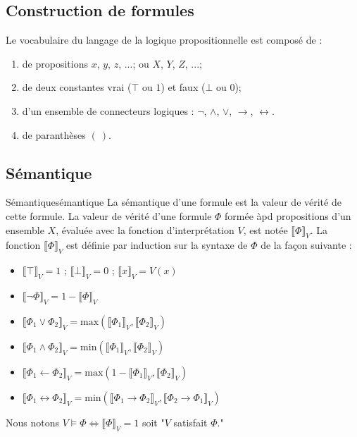 \subsection{Construction de formules}
Le vocabulaire du langage de la logique propositionnelle est composé de :
\begin{enumerate}
  \item de propositions $x$, $y$, $z$, ...; ou $X$, $Y$, $Z$, ...;
  \item de deux constantes vrai ($\top$ ou $1$) et faux ($\bot$ ou $0$);
  \item d'un ensemble de connecteurs logiques : $\neg$, $\wedge$, $\vee$, $\rightarrow$, $\leftrightarrow$.
  \item de paranthèses $(\ )$.
\end{enumerate}


\subsection{Sémantique}
\begin{definition}{Sémantique}{sémantique}
La sémantique d'une formule est la valeur de vérité de cette formule. La valeur de vérité d'une formule
$\Phi$ formée àpd propositions d'un ensemble $X$, évaluée avec la fonction d'interprétation $V$, est notée $\llbracket \Phi \rrbracket_V$.
La fonction $\llbracket \Phi \rrbracket_V$ est définie par induction sur la syntaxe de $\Phi$ de la façon suivante :
\begin{itemize}[label=$\bullet$]
  \item $\llbracket \top\rrbracket_V = 1$ ; $\llbracket \bot\rrbracket_V = 0$ ; $\llbracket x\rrbracket_V = V(x)$
  \item $\llbracket \neg \Phi\rrbracket_V = 1 - \llbracket \Phi\rrbracket_V$
  \item $\llbracket \Phi_1 \vee \Phi_2\rrbracket_V = \text{max}(\llbracket\Phi_1\rrbracket_V,\llbracket\Phi_2\rrbracket_V)$
  \item $\llbracket \Phi_1 \land \Phi_2\rrbracket_V = \text{min}(\llbracket\Phi_1\rrbracket_V,\llbracket\Phi_2\rrbracket_V)$
  \item $\llbracket \Phi_1 \leftarrow \Phi_2\rrbracket_V = \text{max}(1 - \llbracket\Phi_1\rrbracket_V,\llbracket\Phi_2\rrbracket_V)$
  \item $\llbracket \Phi_1 \leftrightarrow \Phi_2\rrbracket_V = \text{min}(\llbracket\Phi_1\rightarrow\Phi_2\rrbracket_V,\llbracket\Phi_2\rightarrow\Phi_1\rrbracket_V)$
\end{itemize}
Nous notons $V\vDash\Phi\Leftrightarrow\llbracket\Phi\rrbracket_V=1$ soit "$V$ satisfait $\Phi$."
\end{definition}

